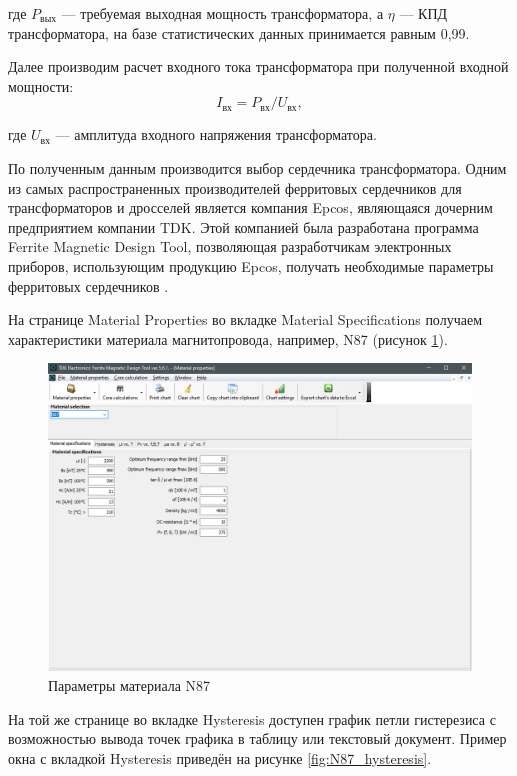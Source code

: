 \documentclass[utf8x, 14pt, oneside, a4paper]{article}
\begin{document}
		\noindent где $P_{\text{вых}}$ --- требуемая выходная мощность трансформатора, а $\eta$ --- КПД трансформатора, на базе статистических данных принимается равным 0,99.
		
		Далее производим расчет входного тока трансформатора при полученной входной мощности:
		\begin{equation}
			I_{\text{вх}}=P_{\text{вх}}/U_{\text{вх}},
		\end{equation}
	
		\noindent где $U_{\text{вх}}$ --- амплитуда входного напряжения трансформатора.
		
		По полученным данным производится выбор сердечника трансформатора. Одним из самых распространенных производителей ферритовых сердечников для трансформаторов и дросселей является компания Epcos, являющаяся дочерним предприятием компании TDK. Этой компанией была разработана программа Ferrite Magnetic Design Tool, позволяющая разработчикам электронных приборов, использующим продукцию Epcos, получать необходимые параметры ферритовых сердечников \cite{bib:mdt_epcos}.
		
		На странице Material Properties во вкладке Material Specifications получаем характеристики материала магнитопровода, например, N87 (рисунок \ref{fig:N87_param}).
		
		\begin{figure}[H]
			\centering
			\includegraphics[width=0.9\linewidth]{"Рисунки/ПараметрыN87"}
			\caption{Параметры материала N87}
			\label{fig:N87_param}
		\end{figure}
	
		На той же странице во вкладке Hysteresis доступен график петли гистерезиса с возможностью вывода точек графика в таблицу или текстовый документ. Пример окна с вкладкой Hysteresis приведён на рисунке \ref{fig:N87_hysteresis}.
		
\end{document}

